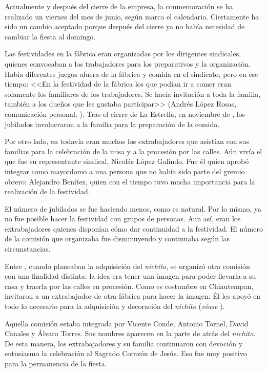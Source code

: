 \documentclass[14pt,letterpaper,twoside]{extbook} %
\begin{document}
\noindent Actualmente y después del cierre de la empresa, la conmemoración se ha realizado un viernes del mes de junio, según marca el calendario. Ciertamente ha sido un cambio aceptado porque después del cierre ya no había necesidad de cambiar la fiesta al domingo.

Las festividades en la fábrica eran organizadas por los dirigentes sindicales, quienes convocaban a los trabajadores para los preparativos y la organización. Había diferentes juegos afuera de la fábrica y comida en el sindicato, pero en ese tiempo: <<En la festividad de la fábrica los que podían ir a comer eran solamente los familiares de los trabajadores. Se hacía invitación a toda la familia, también a los dueños que les gustaba participar>> (Andrés López Rosas, comunicación personal, ). Tras el cierre de La Estrella, en noviembre de , los jubilados involucraron a la familia para la preparación de la comida.

Por otro lado, en  todavía eran muchos los extrabajadores que asistían con sus familias para la celebración de la misa y a la procesión por las calles. Aún vivía el que fue su representante sindical, Nicolás López Galindo. Fue él quien aprobó integrar como mayordomo a una persona que no había sido parte del gremio obrero: Alejandro Benítez, quien con el tiempo tuvo mucha importancia para la realización de la festividad.

El número de jubilados se fue haciendo menos, como es natural. Por lo mismo, ya no fue posible hacer la festividad con grupos de  personas. Aun así, eran los extrabajadores quienes disponían cómo dar continuidad a la festividad. El número de la comisión que organizaba fue disminuyendo y continuaba según las circunstancias.

Entre , cuando planeaban la adquisición del \textit{nichito}, se organizó otra comisión con una finalidad distinta: la idea era tener una imagen para poder llevarla a su casa y traerla por las calles en procesión. Como es costumbre en Chiautempan, invitaron a un extrabajador de otra fábrica para hacer la imagen. Él les apoyó en todo lo necesario para la adquisición y decoración del \textit{nichito} (\emph{véase} ).

Aquella comisión estaba integrada por Vicente Conde, Antonio Tornel, David Canales y Álvaro Torres. Sus nombres aparecen en la parte de atrás del \textit{nichito}. De esta manera, los extrabajadores y su familia continuaron con devoción y entusiasmo la celebración al Sagrado Corazón de Jesús. Eso fue muy positivo para la permanencia de la fiesta.
\end{document}
